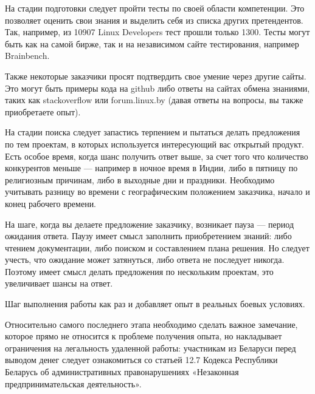 \documentclass[10pt, a5paper]{article}
\begin{document}
На стадии подготовки следует пройти тесты по своей области компетенции. Это позволяет оценить свои знания и выделить себя из списка других претендентов. Так, например, из 10907 Linux Developers тест прошли только 1300. Тесты могут быть как на самой бирже, так и на независимом сайте тестирования, например Brainbench.

Также некоторые заказчики просят подтвердить свое умение через другие сайты. Это могут быть примеры кода на github либо ответы на сайтах обмена знаниями, таких как stackoverflow или forum.linux.by (давая ответы на вопросы, вы также приобретаете опыт).

На стадии поиска следует запастись терпением и пытаться делать предложения по тем проектам, в которых используется интересующий вас открытый продукт. Есть особое время, когда шанс получить ответ выше, за счет того что количество конкурентов меньше --- например в ночное время в Индии, либо в пятницу по религиозным причинам, либо в выходные дни и праздники. Необходимо учитывать разницу во времени с географическим положением заказчика, начало и конец рабочего времени.

На шаге, когда вы делаете предложение заказчику, возникает пауза --- период ожидания ответа. Паузу имеет смысл заполнить приобретением знаний: либо чтением документации, либо поиском и составлением плана решения. Но следует учесть, что ожидание может затянуться, либо ответа не последует никогда. Поэтому имеет смысл делать предложения по нескольким проектам, это увеличивает шансы на ответ.

Шаг выполнения работы как раз и добавляет опыт в реальных боевых условиях.

Относительно самого последнего этапа необходимо сделать важное замечание, которое прямо не относится к проблеме получения опыта, но накладывает ограничения на легальность удаленной работы: участникам из Беларуси перед выводом денег следует ознакомиться со статьей 12.7 Кодекса Республики Беларусь об административных правонарушениях «Незаконная предпринимательская деятельность».
\end{document}
